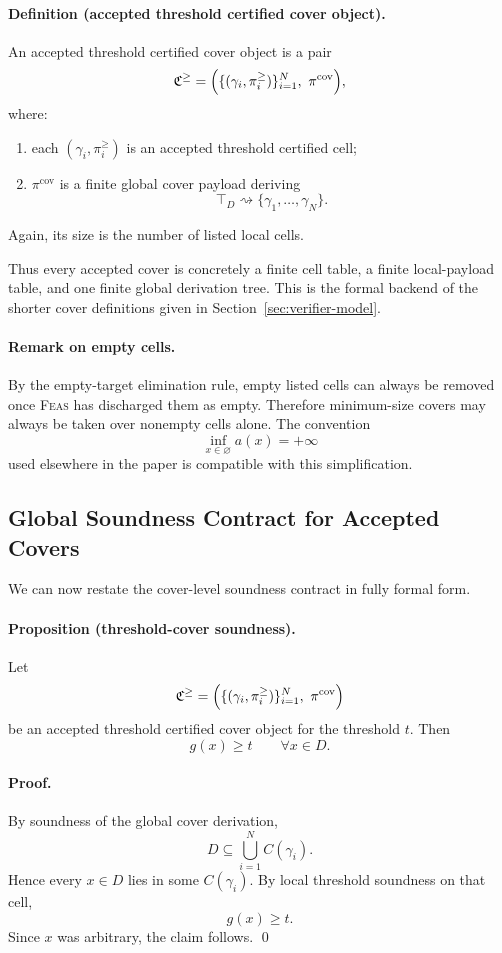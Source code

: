 \paragraph{Definition (accepted threshold certified cover object).}
An accepted threshold certified cover object is a pair
\[
\mathfrak C^{\ge}
=
\Bigl(\{(\gamma_i,\pi_i^{\ge})\}_{i=1}^N,\ \pi^{\mathrm{cov}}\Bigr),
\]
where:
\begin{enumerate}
    \item each $(\gamma_i,\pi_i^{\ge})$ is an accepted threshold certified cell;
    \item $\pi^{\mathrm{cov}}$ is a finite global cover payload deriving
    \[
    \top_D \rightsquigarrow \{\gamma_1,\dots,\gamma_N\}.
    \]
\end{enumerate}
Again, its size is the number of listed local cells.

Thus every accepted cover is concretely a finite cell table, a finite local-payload table, and one finite global derivation tree. This is the formal backend of the shorter cover definitions given in Section~\ref{sec:verifier-model}.

\paragraph{Remark on empty cells.}
By the empty-target elimination rule, empty listed cells can always be removed once \textsc{Feas} has discharged them as empty. Therefore minimum-size covers may always be taken over nonempty cells alone. The convention
\[
\inf_{x\in\varnothing} a(x)=+\infty
\]
used elsewhere in the paper is compatible with this simplification.

\subsection{Global Soundness Contract for Accepted Covers}

We can now restate the cover-level soundness contract in fully formal form.

\paragraph{Proposition (threshold-cover soundness).}
Let
\[
\mathfrak C^{\ge}
=
\Bigl(\{(\gamma_i,\pi_i^{\ge})\}_{i=1}^N,\ \pi^{\mathrm{cov}}\Bigr)
\]
be an accepted threshold certified cover object for the threshold $t$. Then
\[
g(x)\ge t
\qquad
\forall x\in D.
\]

\paragraph{Proof.}
By soundness of the global cover derivation,
\[
D\subseteq \bigcup_{i=1}^N C(\gamma_i).
\]
Hence every $x\in D$ lies in some $C(\gamma_i)$. By local threshold soundness on that cell,
\[
g(x)\ge t.
\]
Since $x$ was arbitrary, the claim follows. \qed

